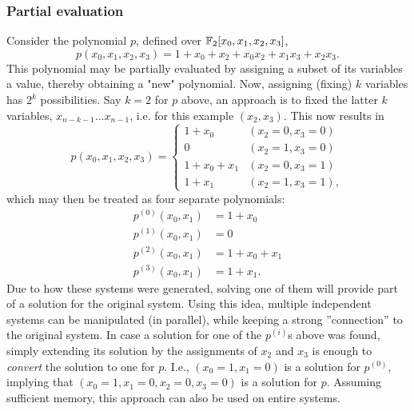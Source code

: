 \subsubsection{Partial evaluation} \label{sec:prereq:partial_eval}
Consider the polynomial $p$, defined over $\mathbb{F}_2[x_0,x_1,x_2,x_3]$,
$$
    p(x_0, x_1, x_2, x_3) = 1 + x_0 + x_2 + x_0x_2 + x_1x_3 + x_2x_3.
$$
This polynomial may be partially evaluated by assigning a subset of its variables a value, thereby obtaining a "new" polynomial. Now, assigning (fixing) $k$ variables has $2^k$ possibilities. Say $k = 2$ for $p$ above, an approach is to fixed the latter $k$ variables, $x_{n - k - 1} \dots x_{n - 1}$, i.e. for this example $(x_2,x_3)$. This now results in 
\begin{equation}
    p(x_0,x_1,x_2,x_3) = 
    \begin{cases}
        1 + x_0       & (x_2 = 0, x_3 = 0)\\
        0             & (x_2 = 1, x_3 = 0)\\
        1 + x_0 + x_1 & (x_2 = 0, x_3 = 1)\\
        1 + x_1       & (x_2 = 1, x_3 = 1),
    \end{cases}
\end{equation} 
which may then be treated as four separate polynomials:
\begin{equation*}
    \begin{split}
        p^{(0)}(x_0, x_1) &= 1 + x_0          \\
        p^{(1)}(x_0, x_1) &= 0                \\           
        p^{(2)}(x_0, x_1) &= 1 + x_0 + x_1    \\
        p^{(3)}(x_0, x_1) &= 1 + x_1.
    \end{split}
\end{equation*}
Due to how these systems were generated, solving one of them will provide part of a solution for the original system. Using this idea, multiple independent systems can be manipulated (in parallel), while keeping a strong ''connection'' to the original system. In case a solution for one of the $p^{(i)}$s above was found, simply extending its solution by the assignments of $x_2$ and $x_3$ is enough to \textit{convert} the solution to one for $p$. I.e., $(x_0 = 1, x_1 = 0)$ is a solution for $p^{(0)}$, implying that $(x_0 = 1, x_1 = 0, x_2 = 0, x_3 = 0)$ is a solution for $p$. Assuming sufficient memory, this approach can also be used on entire systems.

